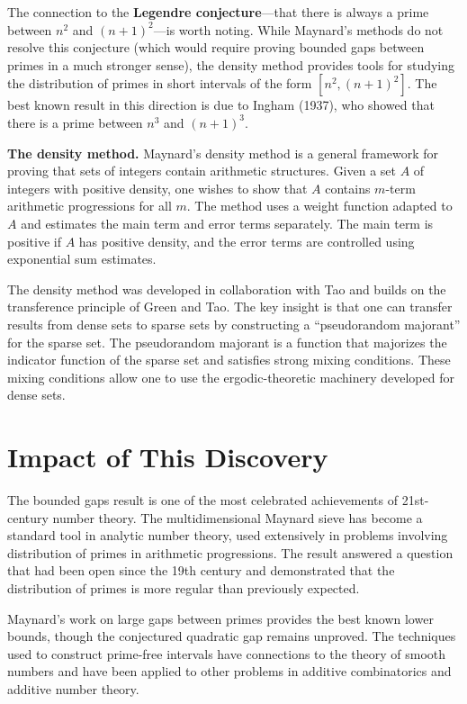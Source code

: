 The connection to the \textbf{Legendre conjecture}---that there is always a prime between $n^2$ and $(n+1)^2$---is worth noting. While Maynard's methods do not resolve this conjecture (which would require proving bounded gaps between primes in a much stronger sense), the density method provides tools for studying the distribution of primes in short intervals of the form $[n^2, (n+1)^2]$. The best known result in this direction is due to Ingham (1937), who showed that there is a prime between $n^3$ and $(n+1)^3$.

\textbf{The density method.} Maynard's density method is a general framework for proving that sets of integers contain arithmetic structures. Given a set $A$ of integers with positive density, one wishes to show that $A$ contains $m$-term arithmetic progressions for all $m$. The method uses a weight function adapted to $A$ and estimates the main term and error terms separately. The main term is positive if $A$ has positive density, and the error terms are controlled using exponential sum estimates.

The density method was developed in collaboration with Tao and builds on the transference principle of Green and Tao. The key insight is that one can transfer results from dense sets to sparse sets by constructing a ``pseudorandom majorant'' for the sparse set. The pseudorandom majorant is a function that majorizes the indicator function of the sparse set and satisfies strong mixing conditions. These mixing conditions allow one to use the ergodic-theoretic machinery developed for dense sets.

\section{Impact of This Discovery}

The bounded gaps result is one of the most celebrated achievements of 21st-century number theory. The multidimensional Maynard sieve has become a standard tool in analytic number theory, used extensively in problems involving distribution of primes in arithmetic progressions. The result answered a question that had been open since the 19th century and demonstrated that the distribution of primes is more regular than previously expected.

Maynard's work on large gaps between primes provides the best known lower bounds, though the conjectured quadratic gap remains unproved. The techniques used to construct prime-free intervals have connections to the theory of smooth numbers and have been applied to other problems in additive combinatorics and additive number theory.

